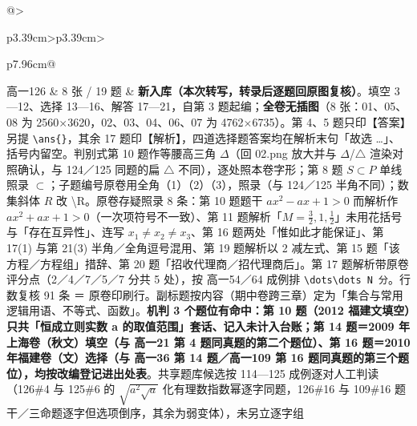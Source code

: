 \documentclass[a4paper,11pt]{article}
\begin{document}
\begin{xltabular}{\textwidth}{@{}>{\raggedright\arraybackslash}p{3.39cm}>{\centering\arraybackslash}p{3.39cm}>{\raggedright\arraybackslash}p{7.96cm}@{}}
高一126 & 8 张 / 19 题 & \textbf{新入库（本次转写，转录后逐题回原图复核）}。填空 3---12、选择 13---16、解答 17---21，自第 3 题起编；\textbf{全卷无插图}（8 张：01、05、08 为 2560$\times$3620，02、03、04、06、07 为 4762$\times$6735）。第 4、5 题只印【答案】另提 \texttt{\textbackslash{}ans\{\}}，其余 17 题印【解析】，四道选择题答案均在解析末句「故选 \ldots」、括号内留空。判别式第 10 题作等腰高三角 \(\Delta\)（回 02.png 放大并与 \(\Delta\)/\(\triangle\) 渲染对照确认，与 124／125 同题的扁 \(\triangle\) 不同），逐处照本卷字形；第 8 题 \(S\subset\allowbreak  P\) 单线照录 \(\subset\allowbreak \)；子题编号原卷用全角（1）（2）（3），照录（与 124／125 半角不同）；数集斜体 \(R\) 改 \textbackslash R。原卷存疑照录 8 条：第 10 题题干 \(ax^2-ax+\allowbreak 1>0\) 而解析作 \(ax^2+ax+\allowbreak 1>0\)（一次项符号不一致）、第 11 题解析「\(M=\allowbreak \frac32,\allowbreak 1,\allowbreak \frac12\)」未用花括号与「存在互异性」、连写 \(x_1\neq x_2\neq x_3\)、第 16 题两处「惟如此才能保证」、第 17(1) 与第 21(3) 半角／全角逗号混用、第 19 题解析以 2 减左式、第 15 题「该方程／方程组」措辞、第 20 题「招收代理商／招代理商后」。第 17 题解析带原卷评分点（2／4／7／5／7 分共 5 处），按 高一54／64 成例排 \texttt{\textbackslash{}dots\textbackslash{}dots\ N\ 分}。行数复核 91 条 ＝ 原卷印刷行。副标题按内容（期中卷跨三章）定为「集合与常用逻辑用语、不等式、函数」。\textbf{机判 3 个题位有命中：第 10 题（2012 福建文填空）只共「恒成立则实数 a 的取值范围」套话、记入未计入台账；第 14 题＝2009 年上海卷（秋文）填空（与 高一21 第 4 题同真题的第二个题位）、第 16 题＝2010 年福建卷（文）选择（与 高一36 第 14 题／高一109 第 16 题同真题的第三个题位），均按改编登记进出处表}。共享题库候选按 114---125 成例逐对人工判读（126\#4 与 125\#6 的 \(\sqrt{a^2\sqrt a}\) 化有理数指数幂逐字同题，126\#16 与 109\#16 题干／三命题逐字但选项倒序，其余为弱变体），未另立逐字组 \\ \addlinespace[1pt]

\end{xltabular}
\end{document}

